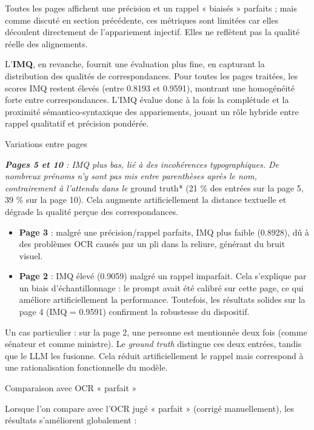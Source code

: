 Toutes les pages affichent une précision et un rappel « biaisés » parfaits ; mais comme discuté en section précédente, ces métriques sont limitées car elles découlent directement de l’appariement injectif. Elles ne reflètent pas la qualité réelle des alignements.

L’\textbf{IMQ}, en revanche, fournit une évaluation plus fine, en capturant la distribution des qualités de correspondances. Pour toutes les pages traitées, les scores IMQ restent élevés (entre 0.8193 et 0.9591), montrant une homogénéité forte entre correspondances. L’IMQ évalue donc à la fois la complétude et la proximité sémantico-syntaxique des appariements, jouant un rôle hybride entre rappel qualitatif et précision pondérée.

 Variations entre pages

\emph{ \textbf{Pages 5 et 10} : IMQ plus bas, lié à des incohérences typographiques. De nombreux prénoms n’y sont pas mis entre parenthèses après le nom, contrairement à l’attendu dans le }ground truth* (21 \% des entrées sur la page 5, 39 \% sur la page 10). Cela augmente artificiellement la distance textuelle et dégrade la qualité perçue des correspondances.

\begin{itemize}
\item \textbf{Page 3} : malgré une précision/rappel parfaits, IMQ plus faible (0.8928), dû à des problèmes OCR causés par un pli dans la reliure, générant du bruit visuel.

\item \textbf{Page 2} : IMQ élevé (0.9059) malgré un rappel imparfait. Cela s’explique par un biais d’échantillonnage : le prompt avait été calibré sur cette page, ce qui améliore artificiellement la performance. Toutefois, les résultats solides sur la page 4 (IMQ = 0.9591) confirment la robustesse du dispositif.

\end{itemize}
Un cas particulier : sur la page 2, une personne est mentionnée deux fois (comme sénateur et comme ministre). Le \emph{ground truth} distingue ces deux entrées, tandis que le LLM les fusionne. Cela réduit artificiellement le rappel mais correspond à une rationalisation fonctionnelle du modèle.

 Comparaison avec OCR « parfait »

Lorsque l’on compare avec l’OCR jugé « parfait » (corrigé manuellement), les résultats s’améliorent globalement :

